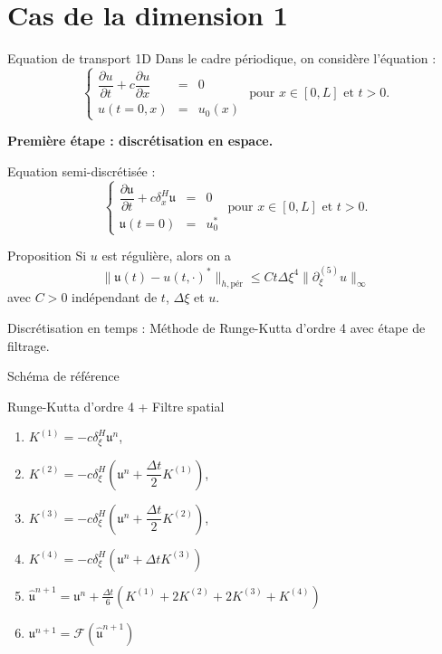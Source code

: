 \documentclass[11pt]{beamer}
\begin{document}
\section{Cas de la dimension 1}
\begin{frame}{Equation de transport 1D}
Dans le cadre périodique, on considère l'équation :
$$
\left\lbrace
\begin{array}{rcl}
\dfrac{\partial u}{\partial t} + c \dfrac{\partial u}{\partial x} & = & 0 \\
u(t=0,x) & = & u_0(x)
\end{array}
\right. \text{ pour } x \in [0,L] \text{ et } t>0.
$$
\begin{block}{}
\textbf{Première étape : discrétisation en espace.}
\end{block}
Equation semi-discrétisée :
$$
\left\lbrace
\begin{array}{rcl}
\dfrac{\partial \mathfrak{u}}{\partial t} + c \delta_x^H \mathfrak{u} & = & 0 \\
\mathfrak{u}(t=0) & = & u_0^*
\end{array}
\right. \text{ pour } x \in [0,L] \text{ et } t>0.
$$
\end{frame}


\begin{frame}{}
\begin{block}{Proposition}
Si $u$ est régulière, alors on a
$$
\| \mathfrak{u}(t) - u(t,\cdot)^* \|_{h,\text{pér}} \leq C t \Delta \xi^4 \| \partial_{\xi}^{(5)}u \|_{\infty}
$$
avec $C>0$ indépendant de $t$, $\Delta \xi$ et $u$.
\end{block}

\begin{block}{Discrétisation en temps :}
Méthode de Runge-Kutta d'ordre 4 avec étape de filtrage.
\end{block}
\end{frame}


\begin{frame}{Schéma de référence}
\begin{block}{Runge-Kutta d'ordre 4 + Filtre spatial
}
\begin{enumerate}
\item $K^{(1)} = - c \delta_{\xi}^H \mathfrak{u}^n$,
\item $K^{(2)} = - c \delta_{\xi}^H \left( \mathfrak{u}^n + \dfrac{\Delta t}{2} K^{(1)} \right)$,
\item $K^{(3)} = - c \delta_{\xi}^H \left( \mathfrak{u}^n + \dfrac{\Delta t}{2} K^{(2)} \right)$,
\item $K^{(4)} = - c \delta_{\xi}^H \left( \mathfrak{u}^n + \Delta t K^{(3)} \right)$
\item $\hat{\mathfrak{u}}^{n+1} = \mathfrak{u}^n + \frac{\Delta t}{6} \left( K^{(1)} + 2 K^{(2)} + 2 K^{(3)} + K^{(4)} \right)$
\item $\mathfrak{u}^{n+1} = \mathcal{F}(\hat{\mathfrak{u}}^{n+1})$
\end{enumerate}
\end{block}
\end{frame}
\end{document}
